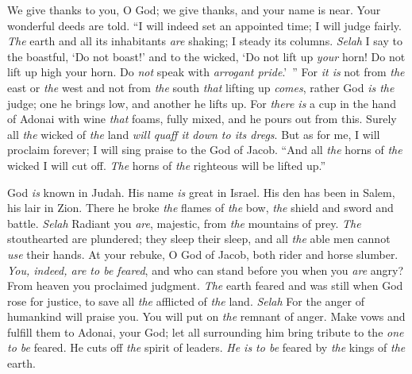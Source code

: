 \begin{biblechapter} %
 We give thanks to you, O God; 
we give thanks, and your name is near. 
Your wonderful deeds are told.
\verse “I will indeed set an appointed time; 
I will judge fairly.
\verse \textit{The} earth and all its inhabitants \textit{are} shaking; 
I steady its columns. \textit{Selah}
\verse I say to the boastful, ‘Do not boast!’ 
and to the wicked, ‘Do not lift up \textit{your} horn!
\verse Do not lift up high your horn. 
Do \textit{not} speak with \textit{arrogant pride}.’ ”
\verse For \textit{it is} not from \textit{the} east or \textit{the} west 
and not from \textit{the} south \textit{that} lifting up \textit{comes},
\verse rather God \textit{is the} judge; 
one he brings low, and another he lifts up.
\verse For \textit{there is} a cup in the hand of Adonai 
with wine \textit{that} foams, fully mixed, 
and he pours out from this. 
Surely all \textit{the} wicked of \textit{the} land 
\textit{will quaff it down \textit{to} its dregs}. 
\verse But as for me, I will proclaim forever; 
I will sing praise to the God of Jacob.
\verse “And all \textit{the} horns of \textit{the} wicked I will cut off. 
\textit{The} horns of \textit{the} righteous will be lifted up.”
\end{biblechapter}

\begin{biblechapter} %
 God \textit{is} known in Judah. 
His name \textit{is} great in Israel.
\verse His den has been in Salem, 
his lair in Zion.
\verse There he broke \textit{the} flames of \textit{the} bow, 
\textit{the} shield and sword and battle. \textit{Selah}
\verse Radiant you \textit{are}, majestic, 
from \textit{the} mountains of prey.
\verse \textit{The} stouthearted are plundered; 
they sleep their sleep, 
and all \textit{the} able men cannot \textit{use} their hands.
\verse At your rebuke, O God of Jacob, 
both rider and horse slumber.
\verse \textit{You, indeed, are to be feared}, 
and who can stand before you 
when you \textit{are} angry? 
\verse From heaven you proclaimed judgment. 
\textit{The} earth feared and was still
\verse when God rose for justice, 
to save all \textit{the} afflicted of \textit{the} land. \textit{Selah}
\verse For the anger of humankind will praise you. 
You will put on \textit{the} remnant of anger.
\verse Make vows and fulfill them to Adonai, your God; 
let all surrounding him 
bring tribute to the \textit{one to be} feared.
\verse He cuts off \textit{the} spirit of leaders. 
\textit{He is to be} feared by \textit{the} kings of \textit{the} earth.
\end{biblechapter}

